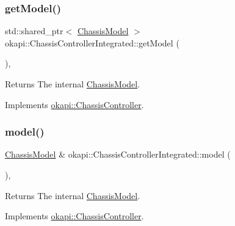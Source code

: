 \subsubsection{\texorpdfstring{getModel()}{getModel()}}
{\footnotesize\ttfamily std\+::shared\+\_\+ptr$<$ \mbox{\hyperlink{classokapi_1_1ChassisModel}{Chassis\+Model}} $>$ okapi\+::\+Chassis\+Controller\+Integrated\+::get\+Model (\begin{DoxyParamCaption}{ }\end{DoxyParamCaption})\hspace{0.3cm}{\ttfamily [override]}, {\ttfamily [virtual]}}

\begin{DoxyReturn}{Returns}
The internal \mbox{\hyperlink{classokapi_1_1ChassisModel}{Chassis\+Model}}. 
\end{DoxyReturn}


Implements \mbox{\hyperlink{classokapi_1_1ChassisController_a1971d4b54b61718437824c026aca53c9}{okapi\+::\+Chassis\+Controller}}.

\mbox{\label{classokapi_1_1ChassisControllerIntegrated_a726fc6cd37748b860e56ddb586b5555a}} 
\subsubsection{\texorpdfstring{model()}{model()}}
{\footnotesize\ttfamily \mbox{\hyperlink{classokapi_1_1ChassisModel}{Chassis\+Model}} \& okapi\+::\+Chassis\+Controller\+Integrated\+::model (\begin{DoxyParamCaption}{ }\end{DoxyParamCaption})\hspace{0.3cm}{\ttfamily [override]}, {\ttfamily [virtual]}}

\begin{DoxyReturn}{Returns}
The internal \mbox{\hyperlink{classokapi_1_1ChassisModel}{Chassis\+Model}}. 
\end{DoxyReturn}


Implements \mbox{\hyperlink{classokapi_1_1ChassisController_a239802eda7e4317a65d1a04994f7b97e}{okapi\+::\+Chassis\+Controller}}.

\mbox{\label{classokapi_1_1ChassisControllerIntegrated_aa9af3fb56afdb940f92bd8016ef63925}} 
